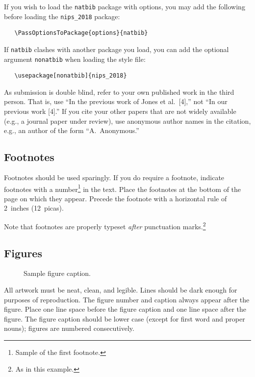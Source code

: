 \documentclass{article}
\begin{document}
If you wish to load the \verb+natbib+ package with options, you may
add the following before loading the \verb+nips_2018+ package:
\begin{verbatim}
   \PassOptionsToPackage{options}{natbib}
\end{verbatim}

If \verb+natbib+ clashes with another package you load, you can add
the optional argument \verb+nonatbib+ when loading the style file:
\begin{verbatim}
   \usepackage[nonatbib]{nips_2018}
\end{verbatim}

As submission is double blind, refer to your own published work in the
third person. That is, use ``In the previous work of Jones et
al.\ [4],'' not ``In our previous work [4].'' If you cite your other
papers that are not widely available (e.g., a journal paper under
review), use anonymous author names in the citation, e.g., an author
of the form ``A.\ Anonymous.''

\subsection{Footnotes}

Footnotes should be used sparingly.  If you do require a footnote,
indicate footnotes with a number\footnote{Sample of the first
  footnote.} in the text. Place the footnotes at the bottom of the
page on which they appear.  Precede the footnote with a horizontal
rule of 2~inches (12~picas).

Note that footnotes are properly typeset \emph{after} punctuation
marks.\footnote{As in this example.}

\subsection{Figures}

\begin{figure}
  \centering
  \fbox{\rule[-.5cm]{0cm}{4cm} \rule[-.5cm]{4cm}{0cm}}
  \caption{Sample figure caption.}
\end{figure}

All artwork must be neat, clean, and legible. Lines should be dark
enough for purposes of reproduction. The figure number and caption
always appear after the figure. Place one line space before the figure
caption and one line space after the figure. The figure caption should
be lower case (except for first word and proper nouns); figures are
numbered consecutively.
\end{document}
